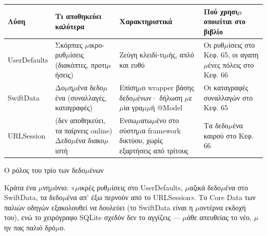 


\begin{center}
\begin{tabularx}{\linewidth}{|X|X|X|X|}
\hline
\textbf{Λύση} & \textbf{Τι αποθηκεύει καλύτερα} & \textbf{Χαρακτηριστικά} & \textbf{Πού χρησι$\mu$οποιείται στο βιβλίο} \tabularnewline
\hline
UserDefaults & Σκόρπιες $\mu$ικρο-ρυθ$\mu$ίσεις (διακόπτες, προτι$\mu$ήσεις) & Ζεύγη κλειδί-τι$\mu$ής, απλό και ευθύ & Οι ρυθ$\mu$ίσεις στο Κεφ. 65, οι αγαπη$\mu$ένες πόλεις στο Κεφ. 66 \tabularnewline
SwiftData & Δο$\mu$η$\mu$ένα δεδο$\mu$ένα (συναλλαγές, καταγραφές) & Επίση$\mu$ο wrapper βάσης δεδο$\mu$ένων· δήλωση $\mu$ε $\mu$ία γρα$\mu$$\mu$ή @Model & Οι καταγραφές συναλλαγών στο Κεφ. 65 \tabularnewline
URLSession & (δεν αποθηκεύει, τα παίρνεις online) Δεδο$\mu$ένα διακο$\mu$ιστή & Ενσω$\mu$ατω$\mu$ένο στο σύστη$\mu$α framework δικτύου, χωρίς εξαρτήσεις από τρίτους & Τα δεδο$\mu$ένα καιρού στο Κεφ. 66 \tabularnewline
\hline
\end{tabularx}
\end{center}

\begin{center}\small\color{gray}Ο ρόλος του τρίο των δεδο$\mu$ένων\end{center}

Κράτα ένα $\mu$νη$\mu$όνιο: «$\mu$ικρές ρυθ$\mu$ίσεις στο UserDefaults, $\mu$αζικά δεδο$\mu$ένα στο SwiftData, τα δεδο$\mu$ένα απ' έξω περνούν από το URLSession». Το Core Data των παλιών οδηγών εξακολουθεί να δουλεύει (το SwiftData είναι η $\mu$οντέρνα εκδοχή του), ενώ το χειρόγραφο SQLite σχεδόν δεν το αγγίζεις — $\mu$άθε απευθείας το νέο, $\mu$ην πας παλιό δρό$\mu$ο.


